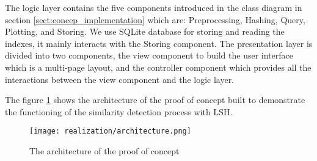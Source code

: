 The logic layer contains the five components introduced in the class diagram
in section \ref{sect:concep_implementation} which are: Preprocessing, Hashing,
Query, Plotting, and Storing. We use SQLite database for storing and reading the
indexes, it mainly interacts with the Storing component. The presentation layer
is divided into two components, the view component to build the user interface
which is a multi-page layout, and the controller component which provides all
the interactions between the view component and the logic layer.

The figure \ref{fig:architecture} shows the architecture of the proof of concept
built to demonstrate the functioning of the similarity detection process with
LSH.

\begin{figure}[h]
    \centering
    \texttt{[image: realization/architecture.png]}
    \caption{The architecture of the proof of concept}
    \label{fig:architecture}
\end{figure}